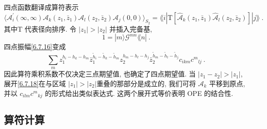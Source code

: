 四点函数翻译成算符表示
\begin{equation}
	\bigl\langle\mathscr{A}_{i}^{\prime}(\infty, \infty) \mathscr{A}_{k}(z_{1}, \bar{z}_{1}) 
	\mathscr{A}_{l}(z_{2}, \bar{z}_{2}) \mathscr{A}_{j}(0,0)\bigr\rangle_{S_{2}} 
	=\lAngle i |\mathrm{T}[\hat{\mathscr{A}}_{k}(z_{1}, \bar{z}_{1}) \hat{\mathscr{A}}_{l}(z_{2}, \bar{z}_{2})]|j\rAngle \:. \label{6.7.16}
\end{equation}
其中$\mathrm{T}$ 代表径向排序. 令 $|z_{1}| > |z_{2}|$ 并插入完备基,
\begin{equation}
	1=|m\rangle \mathscr{G}^{m n} \lAngle n| \:. \label{6.7.17}
\end{equation}
四点振幅\eqref{6.7.16}变成
\begin{equation}
	\sum_{m} z_{1}^{h_{i}-h_{k}-h_{m}} \bar{z}_{1}^{\tilde{h}_{i}-\tilde{h}_{k}-\tilde{h}_{m}} z_{2}^{h_{m}-h_{l}-h_{j}} 
	\bar{z}_{2}^{\tilde{h}_{m}-\tilde{h}_{l}-\tilde{h}_{j}} c_{i k m} c^{m}{}_{l j} \:. \label{6.7.18}
\end{equation}
因此算符乘积系数不仅决定三点期望值, 也确定了四点期望值. 当 $|z_{1}-z_{2}|>|z_{1}|$, 展开\eqref{6.7.18}在与区域 $|z_{1}|>|z_{2}|$重叠的那部分是成立的, 
我们可将 $\mathscr{A}_{k}$ 平移到原点, 并以 $c_{i l m} c^{m}{}_{k j} $ 的形式给出类似表达式. 这两个展开式等价表明 OPE 的结合性.

\subsection*{算符计算}


